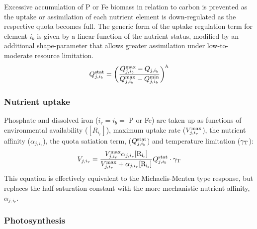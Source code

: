 \documentclass[gmd, manuscript]{copernicus}
\begin{document}
Excessive accumulation of P or Fe biomass in relation to carbon is prevented as the uptake or assimilation of each nutrient element is down-regulated as the respective quota becomes full. The generic form of the uptake regulation term for element $i_b$ is given by a linear function of the nutrient status, modified by an additional shape-parameter  \cite[$h$=$0.1$;][]{Geider:1998} that allows greater assimilation under low-to-moderate resource limitation.
%
\begin{equation}
\label{QstatN}
Q_{j,i_b}^{\rm stat} = \bigg(\frac{Q^{\rm max}_{j,i_b}-Q_{j,i_b}}{Q_{j,i_b}^{\rm max}-Q_{j,i_b}^{\rm min}}\bigg)^h
\end{equation}
%

\subsubsection{Nutrient uptake}

Phosphate and dissolved iron ($i_r=i_b=$ P or Fe) are taken up as functions of environmental availability ($[R_{i_r}]$), maximum uptake rate ($V_{j,i_r}^{\rm max}$), the nutrient affinity ($\alpha_{j,i_r}$), the quota satiation term, ($Q^{\rm stat}_{j,i_b}$) and temperature limitation ($\gamma_{\rm T}$):
%
\begin{equation}
V_{j,i_r} = \frac{V_{j,i_r}^{\rm max} \alpha_{j,i_r} {\rm [R_{i_r}]}}{V_{j,i_r}^{\rm max} + \alpha_{j,i_r}{\rm [R_{i_r}]}} Q^{\rm stat}_{j,i_b} \cdot \gamma_{\rm T}
\end{equation}
%
This equation is effectively equivalent to the Michaelis-Menten type response, but replaces the half-saturation constant with the more mechanistic nutrient affinity, $\alpha_{j,i_r}$.

\subsubsection{Photosynthesis}
\end{document}
